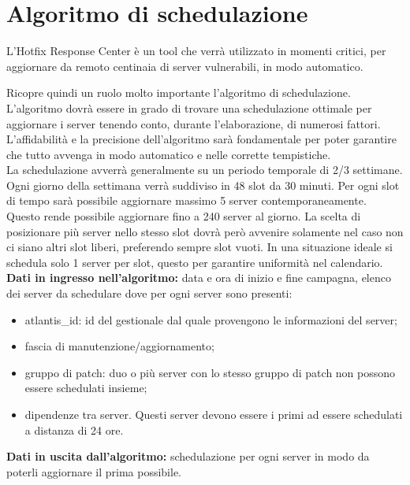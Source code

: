 \section{Algoritmo di schedulazione}
L’Hotfix Response Center è un tool che verrà utilizzato in momenti 
critici, per aggiornare da remoto centinaia di server vulnerabili, 
in modo automatico.

Ricopre quindi un ruolo molto importante l’algoritmo di schedulazione. 
L’algoritmo dovrà essere in grado di trovare una schedulazione 
ottimale per aggiornare i server tenendo conto, durante l'elaborazione, 
di numerosi fattori. L’affidabilità e la 
precisione dell’algoritmo sarà fondamentale per poter garantire che 
tutto avvenga in modo automatico e nelle corrette tempistiche.\\

La schedulazione avverrà generalmente su un periodo temporale 
di 2/3 settimane. Ogni giorno della settimana verrà suddiviso in 48 
slot da 30 minuti. Per ogni slot di tempo sarà possibile aggiornare 
massimo 5 server contemporaneamente. Questo rende possibile aggiornare 
fino a 240 server al giorno. La scelta di posizionare più server nello 
stesso slot dovrà però avvenire solamente nel caso non ci siano altri slot 
liberi, preferendo sempre slot vuoti. In una situazione ideale si schedula 
solo 1 server per slot, questo per garantire uniformità nel calendario.\\

\textbf{Dati in ingresso nell'algoritmo:} data e ora di inizio e fine campagna, elenco dei 
server da schedulare dove per ogni server sono presenti:
\begin{itemize}
\item atlantis\_id: id del gestionale dal quale provengono le informazioni del server;
\item fascia di manutenzione/aggiornamento;
\item gruppo di patch: duo o più server con lo stesso gruppo di patch non possono 
essere schedulati insieme;
\item dipendenze tra server. Questi server devono essere i primi ad essere 
schedulati a distanza di 24 ore.
\end{itemize}

\textbf{Dati in uscita dall'algoritmo:} schedulazione per ogni server in modo da poterli 
aggiornare il prima possibile.


